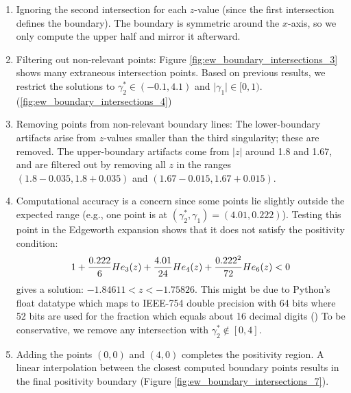 \begin{enumerate}
    \item Ignoring the second intersection for each $z$-value (since the first intersection defines the boundary). The boundary is symmetric around the $x$-axis, so we only compute the upper half and mirror it afterward.
    \item Filtering out non-relevant points: Figure \ref{fig:ew_boundary_intersections_3} shows many extraneous intersection points. Based on previous results, we restrict the solutions to $\gamma_2^* \in (-0.1,4.1)$ and $\vert \gamma_1\vert \in [0,1)$. (\ref{fig:ew_boundary_intersections_4})
    \item Removing points from non-relevant boundary lines: The lower-boundary artifacts arise from $z$-values smaller than the third singularity; these are removed. The upper-boundary artifacts come from $\vert z \vert$ around 1.8 and 1.67, and are filtered out by removing all $z$ in the ranges $(1.8-0.035, 1.8+0.035)$ and $(1.67-0.015,1.67+0.015)$.
    \item Computational accuracy is a concern since some points lie slightly outside the expected range (e.g., one point is at $(\gamma_2^*, \gamma_1) = (4.01, 0.222)$). Testing this point in the Edgeworth expansion shows that it does not satisfy the positivity condition:
    \begin{align}
        1 + \frac{0.222}{6}He_3(z) + \frac{4.01}{24}He_4(z) + \frac{0.222^2}{72}He_6(z)<0 \notag
    \end{align}
    gives a solution: $-1.84611<z<-1.75826$. This might be due to Python's float datatype which maps to IEEE-754 double precision with 64 bits where 52 bits are used for the fraction which equals about 16 decimal digits (\cite{pythonfoundation15FloatingPointArithmetic,leonardo.zAnswerHowCan2013}) To be conservative, we remove any intersection with $\gamma_2^* \notin [0,4]$.
    \item Adding the points $(0,0)$ and $(4,0)$ completes the positivity region. A linear interpolation between the closest computed boundary points results in the final positivity boundary (Figure \ref{fig:ew_boundary_intersections_7}).
\end{enumerate}

